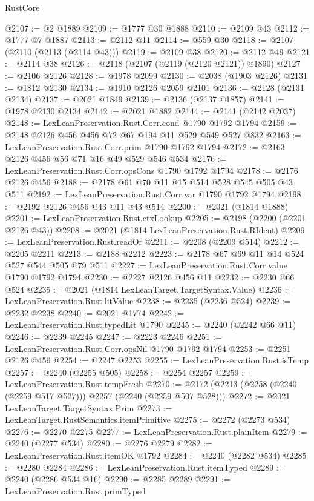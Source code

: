 \begin{lexlean}{RustCore}
\begin{coremodule}
@2107 := @2 @1889
@2109 := @1777 @30 @1888
@2110 := @2109 @43
@2112 := @1777 @7 @1887
@2113 := @2112 @11
@2114 := @559 @30
@2118 := @2107 (@2110 (@2113 (@2114 @43)))
@2119 := @2109 @38
@2120 := @2112 @49
@2121 := @2114 @38
@2126 := @2118 (@2107 (@2119 (@2120 @2121)) @1890)
@2127 := @2106 @2126
@2128 := @1978 @2099
@2130 := @2038 (@1903 @2126)
@2131 := @1812 @2130
@2134 := @1910 @2126 @2059 @2101
@2136 := @2128 (@2131 @2134)
@2137 := @2021 @1849
@2139 := @2136 (@2137 @1857)
@2141 := @1978 @2130 @2134
@2142 := @2021 @1882
@2144 := @2141 (@2142 @2037)
@2148 := LexLeanPreservation.Rust.Corr.cond @1790 @1792 @1794
@2159 := @2148 @2126 @456 @456 @72 @67 @194 @11 @529 @549 @527 @832
@2163 := LexLeanPreservation.Rust.Corr.prim @1790 @1792 @1794
@2172 := @2163 @2126 @456 @56 @71 @16 @49 @529 @546 @534
@2176 := LexLeanPreservation.Rust.Corr.opsCons @1790 @1792 @1794
@2178 := @2176 @2126 @456
@2188 := @2178 @61 @70 @11 @15 @514 @528 @545 @505 @43 @511
@2192 := LexLeanPreservation.Rust.Corr.var @1790 @1792 @1794
@2198 := @2192 @2126 @456 @43 @11 @43 @514
@2200 := @2021 (@1814 @1888)
@2201 := LexLeanPreservation.Rust.ctxLookup
@2205 := @2198 (@2200 (@2201 @2126 @43))
@2208 := @2021 (@1814 LexLeanPreservation.Rust.RIdent)
@2209 := LexLeanPreservation.Rust.readOf
@2211 := @2208 (@2209 @514)
@2212 := @2205 @2211
@2213 := @2188 @2212
@2223 := @2178 @67 @69 @11 @14 @524 @527 @544 @505 @79 @511
@2227 := LexLeanPreservation.Rust.Corr.value @1790 @1792 @1794
@2230 := @2227 @2126 @456 @11
@2232 := @2230 @66 @524
@2235 := @2021 (@1814 LexLeanTarget.TargetSyntax.Value)
@2236 := LexLeanPreservation.Rust.litValue
@2238 := @2235 (@2236 @524)
@2239 := @2232 @2238
@2240 := @2021 @1774
@2242 := LexLeanPreservation.Rust.typedLit @1790
@2245 := @2240 (@2242 @66 @11)
@2246 := @2239 @2245
@2247 := @2223 @2246
@2251 := LexLeanPreservation.Rust.Corr.opsNil @1790 @1792 @1794
@2253 := @2251 @2126 @456
@2254 := @2247 @2253
@2255 := LexLeanPreservation.Rust.isTemp
@2257 := @2240 (@2255 @505)
@2258 := @2254 @2257
@2259 := LexLeanPreservation.Rust.tempFresh
@2270 := @2172 (@2213 (@2258 (@2240 (@2259 @517 @527))) @2257 (@2240 (@2259 @507 @528)))
@2272 := @2021 LexLeanTarget.TargetSyntax.Prim
@2273 := LexLeanTarget.RustSemantics.itemPrimitive
@2275 := @2272 (@2273 @534)
@2276 := @2270 @2275
@2277 := LexLeanPreservation.Rust.plainItem
@2279 := @2240 (@2277 @534)
@2280 := @2276 @2279
@2282 := LexLeanPreservation.Rust.itemOK @1792
@2284 := @2240 (@2282 @534)
@2285 := @2280 @2284
@2286 := LexLeanPreservation.Rust.itemTyped
@2289 := @2240 (@2286 @534 @16)
@2290 := @2285 @2289
@2291 := LexLeanPreservation.Rust.primTyped

\end{coremodule}
\end{lexlean}

